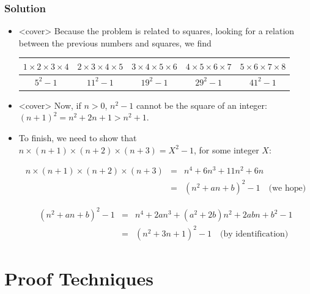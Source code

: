 \documentclass{beamer}
\begin{document}
\begin{frame}%
\frametitle{Solution}


\scriptsize

\begin{itemize}

\item<cover> Because the problem is related to squares, looking for a relation between the previous numbers
and squares, we find\\

\vspace{0.3cm}

\begin{tabular}{|c|c|c|c|c|}
\hline
$1\times2\times3\times4$ & $2\times3\times4\times5$ & $3\times4\times5\times6$ & $4\times5\times6\times7$ & $5\times6\times7\times8$\\
\hline
$5^2 - 1$ & $11^2 - 1$ & $19^2 - 1$ & $29^2 - 1$ & $41^2 - 1$\\
\hline
\end{tabular}
\vspace{0.3cm}

\item<cover> Now, if $n>0$, $n^2 - 1$ cannot be the square of an integer: $(n+1)^2 = n^2 + 2n + 1 > n^2 + 1$.
\vspace{0.3cm}

\item<1-> To finish, we need to show that $n\times(n+1)\times(n+2)\times(n+3) = X^2 - 1$, for some integer $X$:

\begin{eqnarray*}
n\times(n+1)\times(n+2)\times(n+3) &=& n^4 + 6n^3 + 11n^2 + 6n\\
&=& (n^2 + an + b)^2 - 1 \quad \textrm{(we hope)}
\end{eqnarray*}

{
\begin{eqnarray*}
(n^2 + an + b)^2 - 1 &=& n^4 + 2an^3 + (a^2+2b)n^2 + 2abn + b^2 - 1\\
&=& (n^2 + 3n + 1)^2 -1 \quad \textrm{(by identification)}
\end{eqnarray*}
}
\end{itemize}

\end{frame}

\fi

\section{Proof Techniques}
\end{document}
